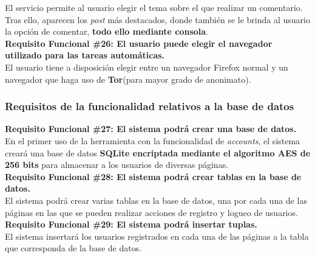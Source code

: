 \begin{adjustwidth}{0.5cm}{}
	El servicio permite al usuario elegir el tema sobre el que realizar un comentario. Tras ello, aparecen los \textit{post} más destacados, donde también se le brinda al usuario la opción de comentar, \textbf{todo ello mediante consola}.\\			
	\linebreak		
	\textbf{Requisito Funcional \#26: El usuario puede elegir el navegador utilizado para las tareas automáticas.}\\
	El usuario tiene a disposición elegir entre un navegador Firefox normal y un navegador que haga uso de \textbf{Tor}(para mayor grado de anonimato).\\				
\end{adjustwidth}
\subsubsection{Requisitos de la funcionalidad relativos a la base de datos}
\begin{adjustwidth}{0.5cm}{}
	\textbf{Requisito Funcional \#27: El sistema podrá crear una base de datos.}\\
	En el primer uso de la herramienta con la funcionalidad de \textit{accounts}, el sistema creará una base de datos \textbf{SQLite encriptada mediante el algoritmo AES de 256 bits} para almacenar a los usuarios de diversas páginas. \\
	\linebreak		
	\textbf{Requisito Funcional \#28: El sistema podrá crear tablas en la base de datos.}\\
	El sistema podrá crear varias tablas en la base de datos, una por cada una de las páginas en las que se pueden realizar acciones de registro y logueo de usuarios. \\
	\linebreak		
	\textbf{Requisito Funcional \#29: El sistema podrá insertar tuplas.}\\
	El sistema insertará los usuarios registrados en cada una de las páginas a la tabla que corresponda de la base de datos. \\	
	\linebreak			
\end{adjustwidth}
